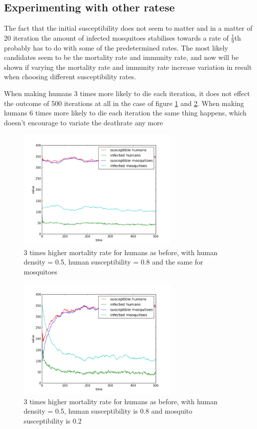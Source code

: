 \documentclass[a4paper]{report}
\begin{document}
\FloatBarrier
\subsection{Experimenting with other ratese}
The fact that the initial susceptibility does not seem to matter and in a matter
of 20 iteration the amount of infected mosquitoes stabilises towards a rate of
$\frac{1}{9}$th probably has to do with some of the predetermined rates. The most likely
candidates seem to be the mortality rate and immunity rate, and now will be shown if
varying the mortality rate and immunity rate increase variation in result when
choosing different susceptibility rates.

When making humans 3 times more likely to die each iteration, it does not effect
the outcome of 500 iterations at all in the case of figure
\ref{fig:death_rate} and \ref{fig:death_rate2}.
When making humans 6 times more likely to die each iteration
the same thing
happens, which doesn't encourage to variate the deathrate any more

\begin{figure}[htbp]
    \centering
    \includegraphics[width=0.7\textwidth]{05_08_05_08_higher_deathrate.png}
    \caption{3 times higher mortality rate for humans as before, with human density =
        0.5, human susceptibility = 0.8 and the same for mosquitoes
    }
    \label{fig:death_rate}
\end{figure}

\begin{figure}[htbp]
    \centering
    \includegraphics[width=0.7\textwidth]{05_08_05_02_higher_deathrate.png}
    \caption{3 times higher mortality rate for humans as before, with human density =
        0.5, human susceptibility is 0.8 and mosquito susceptibility is 0.2
    }
    \label{fig:death_rate2}
\end{figure}
\end{document}
